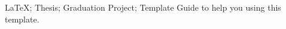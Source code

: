 \makecover


\begin{abstract}{\LaTeX; 论文; 毕业设计; 模板}
讲述如何使用本模板。
\end{abstract}


\begin{abstractEng}{\LaTeX; Thesis; Graduation Project; Template}
Guide to help you using this template.
\end{abstractEng}


\tableofcontents